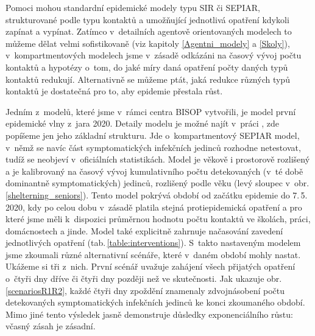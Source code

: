 \vspace{-0.5eM}

Pomoci mohou standardní epidemické modely typu SIR či SEPIAR, strukturované podle typu kontaktů a umožňující jednotlivá opatření kdykoli zapínat a vypínat. Zatímco v~detailních agentově orientovaných modelech to můžeme dělat velmi sofistikovaně (viz kapitoly \ref{Agentni_modely} a \ref{Skoly}), v~kompartmentových modelech jsme v~zásadě odkázáni na časový vývoj počtu kontaktů a hypotézy o~tom, do jaké míry daná opatření počty daných typů kontaktů redukují. Alternativně se můžeme ptát, jaká redukce různých typů kontaktů je dostatečná pro to, aby epidemie přestala růst.   

Jedním z~modelů, které jsme v~rámci centra BISOP vytvořili, je model první epidemické vlny z~jara 2020. Detaily modelu je možné najít v~práci \cite{Berec_modelB}, zde popíšeme jen jeho základní strukturu. Jde o~kompartmentový SEPIAR model, v~němž se navíc část symptomatických infekčních jedinců rozhodne netestovat, tudíž se neobjeví v~oficiálních statistikách. Model je věkově i prostorově rozlišený a je kalibrovaný na časový vývoj kumulativního počtu detekovaných (v~té době dominantně symptomatických) jedinců, rozlišený podle věku (levý sloupec v~obr.\,\ref{shelterning_seniors}). Tento model pokrývá období od začátku epidemie do 7.\,5.\,2020, kdy po celou dobu v~zásadě platila stejná protiepidemická opatření a pro které jsme měli k~dispozici průměrnou hodnotu počtu kontaktů ve školách, práci, domácnostech a jinde. Model také explicitně zahrnuje načasování zavedení jednotlivých opatření (tab.\,\ref{table:interventions}). S~takto nastaveným modelem jsme zkoumali různé alternativní scénáře, které v~daném období mohly nastat. Ukážeme si tři z~nich. První scénář uvažuje zahájení všech přijatých opatření o~čtyři dny dříve či čtyři dny později než ve skutečnosti. Jak ukazuje obr.\,\ref{scenariosR1R2}, každé čtyři dny zpoždění znamenaly zdvojnásobení počtu detekovaných symptomatických infekčních jedinců ke konci zkoumaného období. Mimo jiné tento výsledek jasně demonstruje důsledky exponenciálního růstu: včasný zásah je zásadní. 

